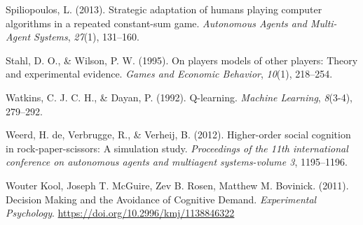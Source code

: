\documentclass[man,floatsintext]{apa6}
\begin{document}
\leavevmode\hypertarget{ref-spiliopoulos2013strategic}{}%
Spiliopoulos, L. (2013). Strategic adaptation of humans playing computer algorithms in a repeated constant-sum game. \emph{Autonomous Agents and Multi-Agent Systems}, \emph{27}(1), 131--160.

\leavevmode\hypertarget{ref-stahl1995players}{}%
Stahl, D. O., \& Wilson, P. W. (1995). On players models of other players: Theory and experimental evidence. \emph{Games and Economic Behavior}, \emph{10}(1), 218--254.

\leavevmode\hypertarget{ref-watkins1992q}{}%
Watkins, C. J. C. H., \& Dayan, P. (1992). Q-learning. \emph{Machine Learning}, \emph{8}(3-4), 279--292.

\leavevmode\hypertarget{ref-de2012higher}{}%
Weerd, H. de, Verbrugge, R., \& Verheij, B. (2012). Higher-order social cognition in rock-paper-scissors: A simulation study. \emph{Proceedings of the 11th international conference on autonomous agents and multiagent systems-volume 3}, 1195--1196.

\leavevmode\hypertarget{ref-Kool_2011}{}%
Wouter Kool, Joseph T. McGuire, Zev B. Rosen, Matthew M. Bovinick. (2011). Decision Making and the Avoidance of Cognitive Demand. \emph{Experimental Psychology}. \url{https://doi.org/10.2996/kmj/1138846322}

\endgroup
\end{document}
